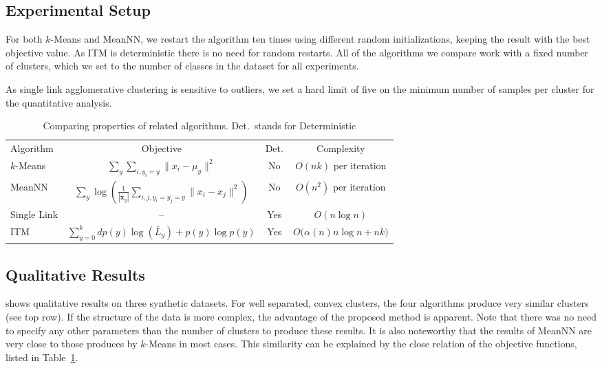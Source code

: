 \subsection{Experimental Setup}
For both $k$-Means and MeanNN, we restart the algorithm ten times using
different random initializations, keeping the result with the best objective
value. As ITM is deterministic there is no need for random restarts.  All of
the algorithms we compare work with a fixed number of clusters, which we set to
the number of classes in the dataset for all experiments.

As single link agglomerative clustering is sensitive to outliers, we set
a hard limit of five on the minimum number of samples per cluster for
the quantitative analysis.

\begin{table}[t]
\centering
\begin{tabularx}{\linewidth}{@{\extracolsep{\fill}}lccc}
\toprule
Algorithm &     Objective &     Det.&      Complexity \\
\cmidrule{1-4}
$k$-Means &     $\displaystyle \sum_y \sum_{i, y_i = y} \| x_i - \mu_y \|^2$ & No  & $O(nk)$ per iteration%
\\
MeanNN &    $\displaystyle \sum_y \log\left(\frac{1}{|\mathbf{x}_y|}\sum_{i,j, y_i=y_j=y} \| x_i - x_j \|^2 \right)$ & No & $O(n^2)$ per iteration\\
Single Link &   -- &    Yes    &    $O(n\log n)$\\
ITM & $\displaystyle \sum_{y=0}^k d p(y) \log(\bar{L}_y  ) + p(y) \log{p(y)}$ & Yes & $O\bigl(\alpha(n) n \log n + nk\bigr)$\\
\bottomrule
\end{tabularx}
\caption{Comparing properties of related algorithms. Det.\ stands for Deterministic}\label{nowotab}
\end{table}


\subsection{Qualitative Results}
 shows qualitative results on three synthetic datasets.
For well separated, convex clusters, the four algorithms produce very similar
clusters (see top row).  If the structure of the data is more complex, the
advantage of the proposed method is apparent.  Note that there was no need to
specify any other parameters than the number of clusters to produce these
results.  It is also noteworthy that the results of MeanNN are very close to
those produces by $k$-Means in most cases. This similarity can be explained
by the close relation of the objective functions, listed in Table~\ref{nowotab}.

